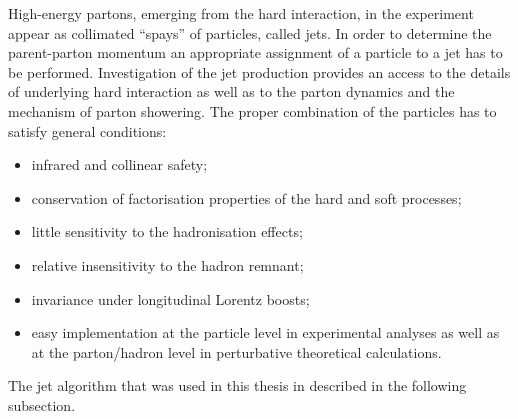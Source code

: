 High-energy partons, emerging from the hard interaction, in the experiment appear as collimated ``spays'' of particles, called jets. In order to determine the parent-parton momentum an appropriate assignment of a particle to a jet has to be performed. Investigation of the jet production provides an access to the details of underlying hard interaction as well as to the parton dynamics and the mechanism of parton showering. The proper combination of the particles has to satisfy general conditions:
\begin{itemize}
	\item infrared and collinear safety;
	\item conservation of factorisation properties of the hard and soft processes;
	\item little sensitivity to the hadronisation effects;
	\item relative insensitivity to the hadron remnant;
	\item invariance under longitudinal Lorentz boosts;
	\item easy implementation at the particle level in experimental analyses as well as at the parton/hadron level in perturbative theoretical calculations.
\end{itemize}
 The jet algorithm that was used in this thesis in described in the following subsection.
